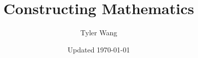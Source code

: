 \documentclass[10pt, openany, english]{extbook}
\title{Constructing Mathematics}
\date{\small Updated \today}
\author{Tyler Wang}
\begin{document}
\maketitle
{}


\edef\mychapter{Contents}
\tableofcontents















\end{document}
